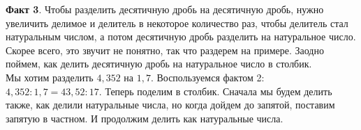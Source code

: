 \documentclass{article}
\begin{document}
\textbf{Факт 3}. Чтобы разделить десятичную дробь на десятичную дробь, нужно увеличить делимое и делитель в некоторое количество раз, чтобы делитель стал натуральным числом, а потом десятичную дробь разделить на натуральное число.\\

Скорее всего, это звучит не понятно, так что раздерем на примере. Заодно поймем, как делить десятичную дробь на натуральное число в столбик.\\
Мы хотим разделить $4,352$ на $1,7$. Воспользуемся фактом 2: $4,352:1,7 = 43,52 : 17$. Теперь поделим в столбик. Сначала мы будем делить также, как делили натуральные числа, но когда дойдем до запятой, поставим запятую в частном. И продолжим делить как натуральные числа. 
\begin{figure}[h]
\end{figure}
\end{document}
